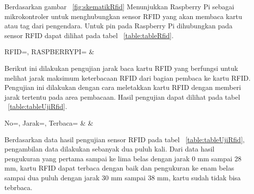 Berdasarkan gambar ~\ref{fig:skematikRfid} Menunjukkan Raspberry Pi sebagai mikrokontroler untuk menghubungkan sensor RFID yang akan membaca kartu atau tag dari pengendara. Untuk pin pada Raspberry Pi dihubungkan pada sensor RFID dapat dilihat pada tabel ~\ref{table:tableRfid}.\newline

\begin{atable}
    \caption{Rangkaian pin RFID ke Raspberry Pi}
    \label{table:tableRfid}
        {
            RFID=\RFID, 
            RASPBERRYPI=\RASPBERRYPI}
        {
            \RFID & 
            \RASPBERRYPI}
\end{atable}

Berikut ini dilakukan pengujian jarak baca kartu RFID yang berfungsi untuk melihat jarak maksimum keterbacaan RFID dari bagian pembaca ke kartu RFID. Pengujian ini dilakukan dengan cara meletakkan kartu RFID dengan memberi jarak tertentu pada area pembacaan. Hasil pengujian dapat dilihat pada tabel ~\ref{table:tableUjiRfid}.

\begin{table}[H]
    \caption{Hasil uji jarak baca RFID}
    \label{table:tableUjiRfid}
    \centering
        {
            No=\No, 
            Jarak=\Jarak,
            Terbaca=\Terbaca}
        {
            \No & 
            \Jarak &
            \Terbaca}
\end{table}

Berdasarkan data hasil pengujian sensor RFID pada tabel ~\ref{table:tableUjiRfid}, pengambilan data dilakukan sebanyak dua puluh kali. Dari data hasil pengukuran yang pertama sampai ke lima belas dengan jarak 0 mm sampai 28 mm, kartu RFID dapat terbaca dengan baik dan pengukuran ke enam belas sampai dua puluh dengan jarak 30 mm sampai 38 mm, kartu sudah tidak bisa tebrbaca.

